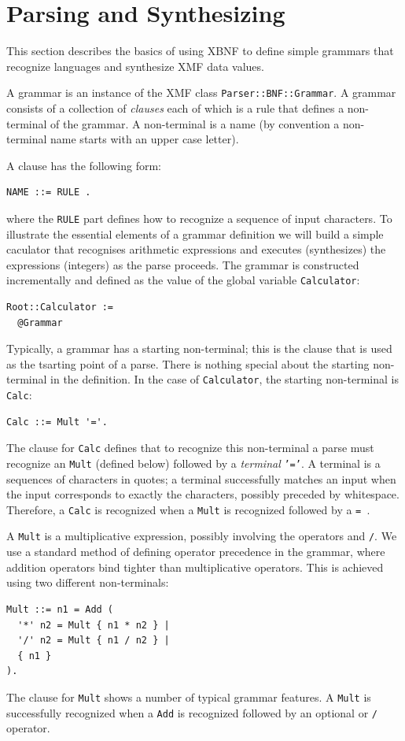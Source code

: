 \documentclass{article}
\begin{document}
\section{Parsing and Synthesizing}

This section describes the basics of using XBNF to define simple grammars
that recognize languages and synthesize XMF data values.

A grammar is an instance of the XMF class {\tt Parser::BNF::Grammar}. A 
grammar consists of a collection of {\em clauses} each of which is a
rule that defines a non-terminal of the grammar. A non-terminal is a
name (by convention a non-terminal name starts with an upper case letter).

A clause has the following form:
\begin{verbatim}
NAME ::= RULE .
\end{verbatim}
where the {\tt RULE} part defines how to recognize a sequence of input
characters. To illustrate the essential elements of a grammar definition
we will build a simple caculator that recognises arithmetic expressions
and executes (synthesizes) the expressions (integers) as the parse proceeds.
The grammar is constructed incrementally and defined as the value of the
global variable {\tt Calculator}:
\begin{verbatim}
Root::Calculator :=
  @Grammar  
\end{verbatim}
Typically, a grammar has a starting non-terminal; this is the clause that
is used as the tsarting point of a parse. There is nothing special about 
the starting non-terminal in the definition. In the case of {\tt Calculator},
the starting non-terminal is {\tt Calc}:
\begin{verbatim}
Calc ::= Mult '='.   
\end{verbatim}
The clause for {\tt Calc} defines that to recognize this non-terminal
a parse must recognize an {\tt Mult} (defined below) followed by a
{\em terminal} {\tt '='}. A terminal is a sequences of characters in 
quotes; a terminal successfully matches an input when the input 
corresponds to exactly the characters, possibly preceded by whitespace.
Therefore, a {\tt Calc} is recognized when a {\tt Mult} is recognized
followed by a {\tt = }.

A {\tt Mult} is a multiplicative expression, possibly involving the 
operators {\tt *} and {\tt /}. We use a standard method of defining
operator precedence in the grammar, where addition operators bind
tighter than multiplicative operators. This is achieved using two different
non-terminals:
\begin{verbatim}
Mult ::= n1 = Add (   
  '*' n2 = Mult { n1 * n2 } |
  '/' n2 = Mult { n1 / n2 } |
  { n1 }      
). 
\end{verbatim}
The clause for {\tt Mult} shows a number of typical grammar features.
A {\tt Mult} is successfully recognized when a {\tt Add} is recognized
followed by an optional {\tt *} or {\tt /} operator.
\end{document}
